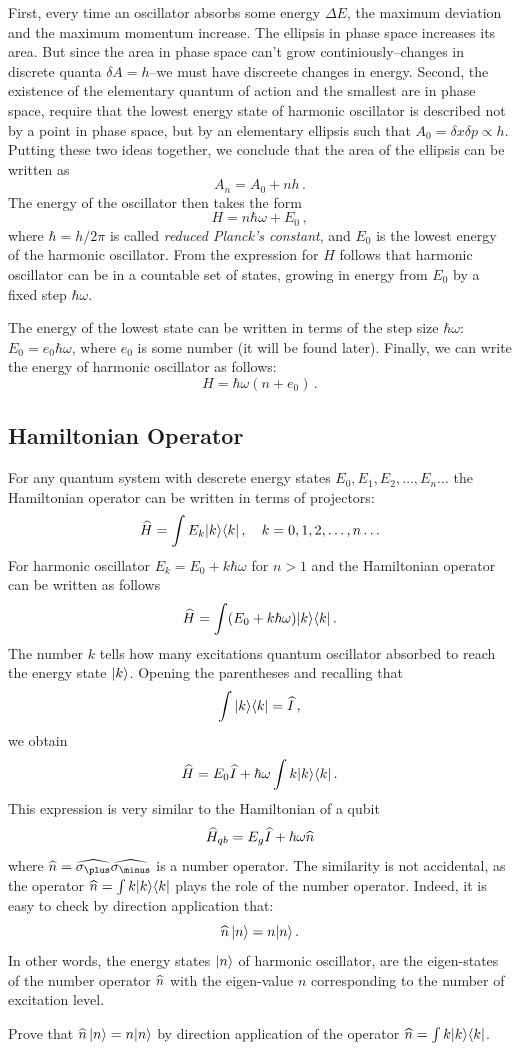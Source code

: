 First, every time an oscillator absorbs some energy $\Delta E$, the maximum deviation and the maximum momentum increase. The ellipsis in phase space increases its area. But since the area in phase space can't grow continiously--changes in discrete quanta $\delta A=h$--we must have discreete changes in energy. Second, the existence of the elementary quantum of action and the smallest are in phase space, require that the lowest energy state of harmonic oscillator is described not by a point in phase space, but by an elementary ellipsis such that $A_0=\delta x\delta p\propto h$. Putting these two ideas together, we conclude that the area of the ellipsis can be written as
\[
A_n = A_0 + nh\,.
\]
The energy of the oscillator then takes the form
\[
H=n\hbar\omega + E_0\,,
\]
where $\hbar=h/2\pi$ is called \emph{reduced Planck's constant}, and $E_0$ is the lowest energy of the harmonic oscillator. From the expression for $H$ follows that harmonic oscillator can be in a countable set of states, growing in energy from $E_0$ by a fixed step $\hbar\omega$. 

The energy of the lowest state can be written in terms of the step size $\hbar\omega$: $E_0=e_0\hbar\omega$, where $e_0$ is some number (it will be found later). Finally, we can write the energy of harmonic oscillator as follows:
\[
H=\hbar\omega(n + e_0)\,.
\]

\subsection{Hamiltonian Operator}
For any quantum system with descrete energy states $E_0, E_1, E_2,\ldots, E_n\ldots$ the Hamiltonian operator can be written in terms of projectors:
\[
\widehat{H}=\int E_k|{k}\rangle\langle{k}|\,,\quad k=0,1,2,\ldots,n\ldots 
\]
For harmonic oscillator $E_k=E_0+k\hbar\omega$ for $n>1$ and the Hamiltonian operator can be written as follows
\[
\widehat{H} = \int (E_0+k\hbar\omega)|{k}\rangle\langle{k}|\,.
\]
The number $k$ tells how many excitations quantum oscillator absorbed to reach the energy state $|{k}\rangle$.
Opening the parentheses and recalling that
\[
\int|{k}\rangle\langle{k}|=\widehat{I}\,,
\] 
we obtain 
\[
\widehat{H} = E_0\widehat{I}+\hbar\omega \int k|{k}\rangle\langle{k}|\,.
\]
This expression is very similar to the Hamiltonian of a qubit 
\[
\widehat{H}_{qb}=E_g\widehat{I}+\hbar\omega\widehat{n}
\]
where $\op{n}=\op{\sigma_\plus}\op{\sigma_\minus}$ is a number operator. The similarity is not accidental, as the operator $\widehat{n}=\int k|{k}\rangle\langle{k}|$ plays the role of the number operator. Indeed, it is easy to check by direction application that:
\[
\widehat{n}\,|{n}\rangle=n|{n}\rangle\,.
\]
In other words, the energy states $|{n}\rangle$ of harmonic oscillator, are the eigen-states of the number operator $\widehat{n}$ with the eigen-value $n$ corresponding to the number of excitation level.
\begin{exercise}
	Prove that $\widehat{n}\,|{n}\rangle=n|{n}\rangle$ by direction application of the operator $\widehat{n}=\int k|{k}\rangle\langle{k}|$.
\end{exercise}

